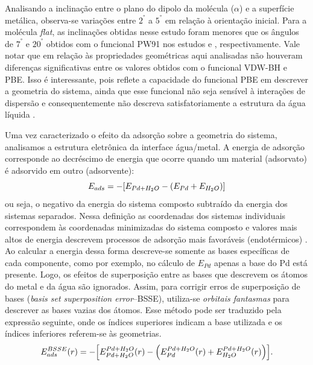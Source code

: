  
 Analisando a inclinação entre o plano do dipolo da molécula ($ \alpha $) e a superfície metálica, observa-se variações entre $ 2^{\si{\degree}} $ a $ 5^{\si{\degree}} $ em relação à orientação inicial. Para a molécula \textit{flat}, as inclinações obtidas nesse estudo foram menores que os ângulos de $ 7^{\si{\degree}} $ e $ 20^{\si{\degree}} $ obtidos com o funcional PW91 nos estudos \cite{michaedelis} e \cite{monomer}, respectivamente. Vale notar que em relação às propriedades geométricas aqui analisadas não houveram diferenças significativas entre os valores obtidos com o funcional VDW-BH e PBE. Isso é interessante, pois reflete a capacidade do funcional PBE em descrever a geometria do sistema, ainda que esse funcional não seja sensível à interações de dispersão e consequentemente não descreva satisfatoriamente a estrutura da água líquida \cite{vdw-func,review_new}.%
 
Uma vez caracterizado o efeito da adsorção sobre a geometria do sistema, analisamos a estrutura eletrônica da interface água/metal. A energia de adsorção corresponde ao decréscimo de energia que ocorre quando um material (adsorvato) é adsorvido em outro (adsorvente):
\begin{equation}
	E_{ads}=-\bqty{E_{Pd+H_{2}O}-\pqty{E_{Pd}+E_{H_2O}}}
\end{equation}
ou seja, o negativo da energia do sistema composto subtraído da energia dos sistemas separados. Nessa definição as coordenadas dos sistemas individuais correspondem às coordenadas minimizadas do sistema composto e valores mais altos de energia descrevem processos de adsorção mais favoráveis (endotérmicos) \cite{vdw-func}. Ao calcular a energia dessa forma descreve-se somente as bases específicas de cada componente, como por exemplo, no cálculo de $ E_{Pd} $ apenas a base do Pd está presente. Logo, os efeitos de superposição entre as bases que descrevem os átomos do metal e da água são ignorados. Assim, para corrigir erros de superposição de bases (\textit{basis set superposition error}--BSSE), utiliza-se \textit{orbitais fantasmas} para descrever as bases vazias dos átomos. Esse método pode ser traduzido pela expressão seguinte, onde os índices superiores indicam a base utilizada e os índices inferiores referem-se às geometrias.
\begin{equation}
	E_{ads}^{BSSE}(r)=-\bqty{E_{Pd+H_2O}^{Pd+H_2O}(r)-\pqty{E_{Pd}^{Pd+H_2O}(r)+E_{H_2O}^{Pd+H_2O}(r)}}.
\end{equation}

